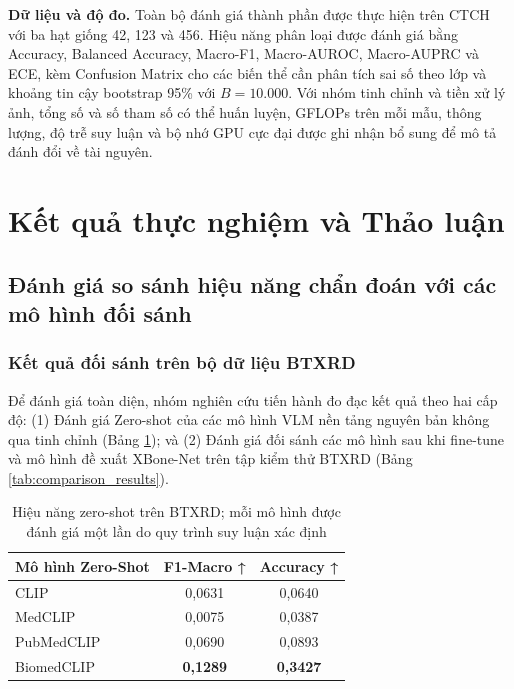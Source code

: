 \textbf{Dữ liệu và độ đo.} Toàn bộ đánh giá thành phần được thực hiện trên CTCH với ba hạt giống 42, 123 và 456. Hiệu năng phân loại được đánh giá bằng Accuracy, Balanced Accuracy, Macro-F1, Macro-AUROC, Macro-AUPRC và ECE, kèm Confusion Matrix cho các biến thể cần phân tích sai số theo lớp và khoảng tin cậy bootstrap 95\% với $B=10.000$. Với nhóm tinh chỉnh và tiền xử lý ảnh, tổng số và số tham số có thể huấn luyện, GFLOPs trên mỗi mẫu, thông lượng, độ trễ suy luận và bộ nhớ GPU cực đại được ghi nhận bổ sung để mô tả đánh đổi về tài nguyên.

\iffalse
\section{Kết quả thực nghiệm và Thảo luận}

\subsection{Đánh giá so sánh hiệu năng chẩn đoán với các mô hình đối sánh}
\subsubsection{Kết quả đối sánh trên bộ dữ liệu BTXRD}
Để đánh giá toàn diện, nhóm nghiên cứu tiến hành đo đạc kết quả theo hai cấp độ: (1) Đánh giá Zero-shot của các mô hình VLM nền tảng nguyên bản không qua tinh chỉnh (Bảng \ref{tab:zeroshot_results}); và (2) Đánh giá đối sánh các mô hình sau khi fine-tune và mô hình đề xuất XBone-Net trên tập kiểm thử BTXRD (Bảng \ref{tab:comparison_results}).

\begin{table}[htbp]
\centering
\begin{tabular}{|l|c|c|}
\hline
\textbf{Mô hình Zero-Shot} & \textbf{F1-Macro ↑} & \textbf{Accuracy ↑} \\ \hline
CLIP             & 0,0631              & 0,0640              \\ \hline
MedCLIP          & 0,0075              & 0,0387              \\ \hline
PubMedCLIP       & 0,0690              & 0,0893              \\ \hline
BiomedCLIP       & \textbf{0,1289}     & \textbf{0,3427}     \\ \hline
\end{tabular}
\caption{Hiệu năng zero-shot trên BTXRD; mỗi mô hình được đánh giá một lần do quy trình suy luận xác định}
\label{tab:zeroshot_results}
\end{table}

